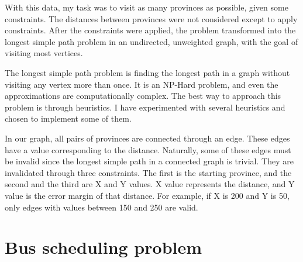 \documentclass[12pt,a4paper]{article}
\begin{document}
With this data, my task was to visit as many provinces as possible, given some
constraints. The distances between provinces were not considered except to apply
constraints. After the constraints were applied, the problem transformed into
the longest simple path problem in an undirected, unweighted graph, with the
goal of visiting most vertices.

The longest simple path problem is finding the longest path in a graph without
visiting any vertex more than once. It is an NP-Hard problem, and even the
approximations are computationally complex. The best way to approach this
problem is through heuristics. I have experimented with several heuristics and
chosen to implement some of them.

In our graph, all pairs of provinces are connected through an edge. These edges
have a value corresponding to the distance. Naturally, some of these edges must
be invalid since the longest simple path in a connected graph is trivial. They
are invalidated through three constraints. The first is the starting province,
and the second and the third are X and Y values. X value represents the
distance, and Y value is the error margin of that distance. For example, if X is
200 and Y is 50, only edges with values between 150 and 250 are valid.

\section{Bus scheduling problem}


\end{document}
